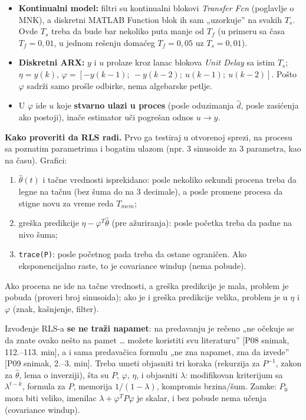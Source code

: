 \documentclass[11pt,a4paper,parskip=half,headsepline,numbers=noenddot]{scrartcl}
\DeclareRobustCommand{\izvor}[1]{{\small\color{izvorC}[#1]}}
\begin{document}
\begin{itemize}
\item \textbf{Kontinualni model:} filtri su kontinualni blokovi \emph{Transfer Fcn} (poglavlje o MNK), a diskretni MATLAB Function blok ih sam „uzorkuje'' na svakih \(T_s\). Ovde \(T_s\) treba da bude bar nekoliko puta manje od \(T_f\) (u primeru sa časa \(T_f = 0{,}01\), u jednom rešenju domaćeg \(T_f = 0{,}05\) uz \(T_s = 0{,}01\)).
\item \textbf{Diskretni ARX:} \(y\) i \(u\) prolaze kroz lanac blokova \emph{Unit Delay} sa istim \(T_s\); \(\eta = y(k)\), \(\varphi = [-y(k-1);\ -y(k-2);\ u(k-1);\ u(k-2)]\). Pošto \(\varphi\) sadrži samo prošle odbirke, nema algebarske petlje.
\item U \(\varphi\) ide \(u\) koje \textbf{stvarno ulazi u proces} (posle oduzimanja \(\hat d\), posle zasićenja ako postoji), inače estimator uči pogrešan odnos \(u \to y\).
\end{itemize}

\textbf{Kako proveriti da RLS radi.} Prvo ga testiraj u otvorenoj sprezi, na procesu sa poznatim parametrima i bogatim ulazom (npr. 3 sinusoide za 3 parametra, kao na času). Grafici:

\begin{enumerate}
\def\labelenumi{\arabic{enumi}.}
\item \(\hat\theta(t)\) i tačne vrednosti isprekidano: posle nekoliko sekundi procena treba da legne na tačnu (bez šuma do na 3 decimale), a posle promene procesa da stigne novu za vreme reda \(T_{mem}\);
\item greška predikcije \(\eta - \varphi^T\hat\theta\) (pre ažuriranja): posle početka treba da padne na nivo šuma;
\item \texttt{trace(P)}: posle početnog pada treba da ostane ograničen. Ako eksponencijalno raste, to je covariance windup (nema pobude).
\end{enumerate}

Ako procena ne ide na tačne vrednosti, a greška predikcije je mala, problem je pobuda (proveri broj sinusoida); ako je i greška predikcije velika, problem je u \(\eta\) i \(\varphi\) (znak, kašnjenje, filter).

\begin{ispit}
Izvođenje RLS-a \textbf{se ne traži napamet}: na predavanju je rečeno „ne očekuje se da znate ovako nešto na pamet \ldots{} možete koristiti svu literaturu'' \izvor{P08 snimak, 112.--113. min}, a i sama predavačica formulu „ne zna napamet, zna da izvede'' \izvor{P09 snimak, 2.--3. min}. Treba umeti objasniti tri koraka (rekurzija za \(P^{-1}\), zakon za \(\hat\theta\), lema o inverziji), šta su \(P\), \(\varphi\), \(\eta\), i objasniti \(\lambda\): modifikovan kriterijum sa \(\lambda^{t-k}\), formula za \(P\), memorija \(1/(1-\lambda)\), kompromis brzina/šum. Zamke: \(P_0\) mora biti veliko, imenilac \(\lambda + \varphi^TP\varphi\) je skalar, i bez pobude nema učenja (covariance windup).
\end{ispit}
\end{document}
